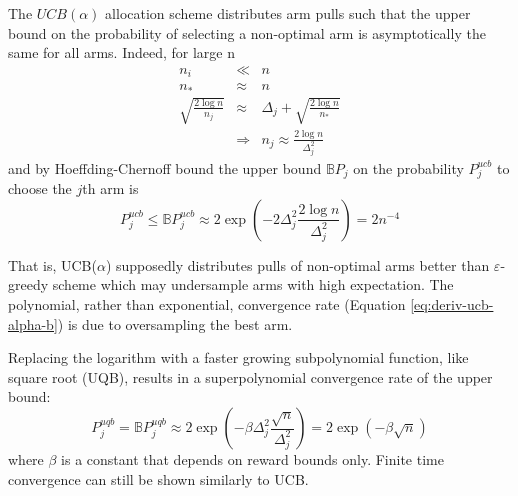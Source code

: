 \documentclass{article}
\begin{document}
The $UCB(\alpha)$ allocation scheme distributes arm pulls such that
the upper bound on the probability of selecting a non-optimal arm is
asymptotically the same for all arms. Indeed, for large n
\begin{eqnarray}
n_i&\ll&n\\
n_*&\approx&n\\
\sqrt {\frac {2 \log n} {n_j}}&\approx&\Delta_j+\sqrt {\frac {2\log n}
  {n_*}} \\
&\Rightarrow& n_j \approx \frac {2\log n} {\Delta_j^2}
\label{eq:deriv-ucb-asymptotic-nj}
\end{eqnarray}
and by Hoeffding-Chernoff bound the upper bound $\mathbb{B}P_j$ on the probability
$P_j^{ucb}$ to choose the $j$th arm is
\begin{equation}
P_j^{ucb}\le\mathbb{B}P_j^{ucb}\approx2\exp\left(-2\Delta_j^2\frac {2\log n}{\Delta_j^2}\right)
             =2n^{-4}
\end{equation}

That is, UCB($\alpha$) supposedly distributes pulls of non-optimal
arms better than $\varepsilon$-greedy
scheme which may undersample arms with high expectation. The
polynomial, rather than exponential, convergence rate (Equation
\ref{eq:deriv-ucb-alpha-b}) is due to oversampling the best arm.

Replacing the logarithm with a faster growing subpolynomial
function, like square root (UQB), results in a superpolynomial convergence
rate of the upper bound:
\begin{equation}
P_j^{uqb}=\mathbb{B}P_j^{uqb}\approx2\exp\left(-\beta\Delta_j^2\frac {\sqrt n}{\Delta_j^2}\right)
            =2\exp(-\beta\sqrt n)
 \end{equation}
where $\beta$ is a constant that depends on reward bounds only.
Finite time convergence can still be shown similarly to UCB.
\end{document}

